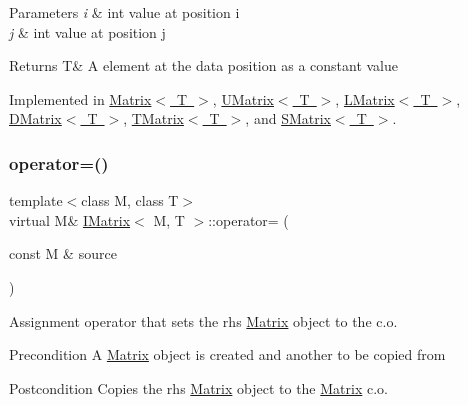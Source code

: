 \begin{DoxyParams}{Parameters}
{\em i} & int value at position i \\
\hline
{\em j} & int value at position j \\
\hline
\end{DoxyParams}
\begin{DoxyReturn}{Returns}
T\& A element at the data position as a constant value 
\end{DoxyReturn}


Implemented in \mbox{\hyperlink{class_matrix_aabc9c2977b9bd176e17808e6bf96a69f}{Matrix$<$ T $>$}}, \mbox{\hyperlink{class_u_matrix_a2fbb6915ab1a6bb7a8944b51600b6d2d}{U\+Matrix$<$ T $>$}}, \mbox{\hyperlink{class_l_matrix_ae9d404d99117892edd2fbfddfaf929f5}{L\+Matrix$<$ T $>$}}, \mbox{\hyperlink{class_d_matrix_a001f8f4ec1a2152ad5fe770072b6609d}{D\+Matrix$<$ T $>$}}, \mbox{\hyperlink{class_t_matrix_a62d9e930e95fd666993afe0c8da1ffa2}{T\+Matrix$<$ T $>$}}, and \mbox{\hyperlink{class_s_matrix_a9255f1dbcfefeff621616f8495215c3d}{S\+Matrix$<$ T $>$}}.

\mbox{\label{class_i_matrix_a9eeb68de7e1d37d1aab439c78fea9be3}} 
\subsubsection{\texorpdfstring{operator=()}{operator=()}}
{\footnotesize\ttfamily template$<$class M, class T$>$ \\
virtual M\& \mbox{\hyperlink{class_i_matrix}{I\+Matrix}}$<$ M, T $>$\+::operator= (\begin{DoxyParamCaption}\item[{const M \&}]{source }\end{DoxyParamCaption})\hspace{0.3cm}{\ttfamily [pure virtual]}}



Assignment operator that sets the rhs \mbox{\hyperlink{class_matrix}{Matrix}} object to the c.\+o. 

\begin{DoxyPrecond}{Precondition}
A \mbox{\hyperlink{class_matrix}{Matrix}} object is created and another to be copied from 
\end{DoxyPrecond}
\begin{DoxyPostcond}{Postcondition}
Copies the rhs \mbox{\hyperlink{class_matrix}{Matrix}} object to the \mbox{\hyperlink{class_matrix}{Matrix}} c.\+o. 
\end{DoxyPostcond}

